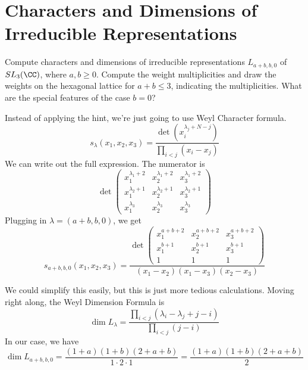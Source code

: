 \documentclass[11pt, headheight=30pt]{scrartcl}
\begin{document}
\section{Characters and Dimensions of Irreducible Representations}

\begin{prob*}
  Compute characters and dimensions of irreducible representations $L_{a+b,b,0}$ of $SL_3(\CC)$, where $a, b \geq 0$. Compute the weight multiplicities and draw the weights on the hexagonal lattice for $a + b \leq 3$, indicating the multiplicities. What are the special features of the case $b = 0$?
\end{prob*}


Instead of applying the hint, we're just going to use Weyl Character formula.
\[
    s_\lambda(x_1, x_2, x_3) = \frac{\det(x_i^{\lambda_j + N - j})}{\prod_{i < j}(x_i - x_j)}
\]
We can write out the full expression. The numerator is
\[
    \det\begin{pmatrix}
        x_1^{\lambda_1 + 2} & x_2^{\lambda_1 + 2} & x_3^{\lambda_1 + 2} \\
        x_1^{\lambda_2 + 1} & x_2^{\lambda_2 + 1} & x_3^{\lambda_2 + 1} \\
        x_1^{\lambda_3} & x_2^{\lambda_3} & x_3^{\lambda_3}
    \end{pmatrix}
\]
Plugging in $\lambda = (a+b, b, 0)$, we get
\[
    s_{a+b,b,0}(x_1, x_2, x_3) = \frac{\det\begin{pmatrix}
        x_1^{a+b+2} & x_2^{a+b+2} & x_3^{a+b+2} \\
        x_1^{b+1} & x_2^{b+1} & x_3^{b+1} \\
        1 & 1 & 1
    \end{pmatrix}}{(x_1 - x_2)(x_1 - x_3)(x_2 - x_3)}
\]

We could simplify this easily, but this is just more tedious calculations. Moving right along, the Weyl Dimension Formula is
\[
    \dim L_\lambda = \frac{\prod_{i < j}(\lambda_i - \lambda_j + j - i)}{\prod_{i < j}(j - i)}    
\]
In our case, we have
\[
    \dim L_{a+b,b,0} = \frac{(1+a)(1+b)(2+a+b)}{1 \cdot 2 \cdot 1} = \frac{(1+a)(1+b)(2+a+b)}{2}
\]
\end{document}
